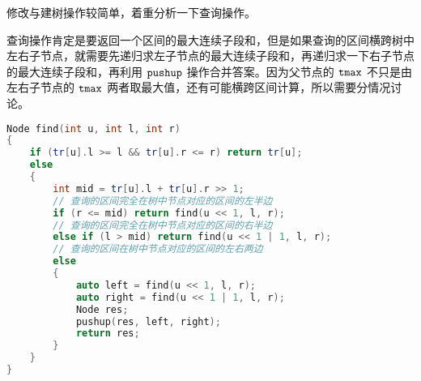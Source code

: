 修改与建树操作较简单，着重分析一下查询操作。

查询操作肯定是要返回一个区间的最大连续子段和，但是如果查询的区间横跨树中左右子节点，就需要先递归求左子节点的最大连续子段和，再递归求一下右子节点的最大连续子段和，再利用 $\tt pushup$ 操作合并答案。因为父节点的 $\tt tmax$ 不只是由左右子节点的 $\tt tmax$ 两者取最大值，还有可能横跨区间计算，所以需要分情况讨论。

\begin{lstlisting}[language=cpp]
Node find(int u, int l, int r)
{
    if (tr[u].l >= l && tr[u].r <= r) return tr[u];
    else 
    {
        int mid = tr[u].l + tr[u].r >> 1;
        // 查询的区间完全在树中节点对应的区间的左半边
        if (r <= mid) return find(u << 1, l, r);    
        // 查询的区间完全在树中节点对应的区间的右半边
        else if (l > mid) return find(u << 1 | 1, l, r);
        // 查询的区间在树中节点对应的区间的左右两边
        else 
        {
            auto left = find(u << 1, l, r);
            auto right = find(u << 1 | 1, l, r);
            Node res;
            pushup(res, left, right);
            return res;
        }
    }
}
\end{lstlisting}